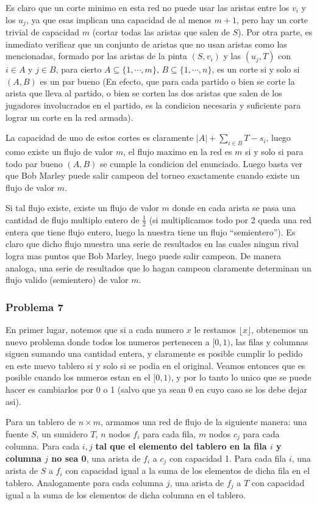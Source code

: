\documentclass{article}
\begin{document}
Es claro que un corte minimo en esta red no puede usar las aristas entre los $v_i$ y los $u_j$, ya que esas implican una capacidad de al menos
$m+1$, pero hay un corte trivial de capacidad $m$ (cortar todas las aristas que salen de $S$). Por otra parte, es inmediato verificar que
un conjunto de aristas que no usan aristas como las mencionadas, formado por las aristas de la pinta $(S,v_i)$ y las $(u_j,T)$ con
$i \in A$ y $j \in B$, para cierto $A \subseteq \{ 1, \cdots , m \}$, $B \subseteq \{ 1, \cdots, n \}$, es un corte si y solo si $(A,B)$ es
un par bueno (En efecto, que para cada partido o bien se corte la arista que lleva al partido, o bien se corten las dos aristas que salen
de los jugadores involucrados en el partido, es la condicion necesaria y suficiente para lograr un corte en la red armada).

La capacidad de uno de estos cortes es claramente $|A| + \sum_{i \in B}{T - s_i}$, luego como existe un flujo de valor $m$, el flujo
maximo en la red es $m$ si y solo si para todo par bueno $(A,B)$ se cumple la condicion del enunciado. Luego basta ver que Bob Marley
puede salir campeon del torneo exactamente cuando existe un flujo de valor $m$.

Si tal flujo existe, existe un flujo de valor $m$ donde en cada arista se pasa una cantidad de flujo multiplo entero de $\frac{1}{2}$ (si multiplicamos
todo por 2 queda una red entera que tiene flujo entero, luego la nuestra tiene un flujo ``semientero''). Es claro que dicho flujo muestra
una serie de resultados en las cuales ningun rival logra mas puntos que Bob Marley, luego puede salir campeon. De manera analoga, una
serie de resultados que lo hagan campeon claramente determinan un flujo valido (semientero) de valor $m$.

\subsubsection{Problema 7}

En primer lugar, notemos que si a cada numero $x$ le restamos $\lfloor x \rfloor$, obtenemos un nuevo problema donde todos los numeros
pertenecen a $[0,1)$, las filas y columnas siguen sumando una cantidad entera, y claramente es posible cumplir lo pedido en este nuevo
tablero si y solo si se podia en el original. Veamos entonces que es posible cuando los numeros estan en el $[0,1)$, y por lo tanto
lo unico que se puede hacer es cambiarlos por 0 o 1 (salvo que ya sean 0 en cuyo caso se los debe dejar asi).

Para un tablero de $n \times m$, armamos una red de flujo de la siguiente manera: una fuente $S$, un sumidero $T$, $n$ nodos $f_i$ para cada
fila, $m$ nodos $c_j$ para cada columna. Para cada $i,j$ \textbf{ tal que el elemento del tablero en la fila $i$ y columna $j$ no sea 0}, 
una arista de $f_i$ a $c_j$ con capacidad 1. Para cada fila $i$, una arista de
$S$ a $f_i$ con capacidad igual a la suma de los elementos de dicha fila en el tablero. Analogamente para cada columna $j$, 
una arista de $f_j$ a $T$ con capacidad igual a la suma de los elementos de dicha columna en el tablero.
\end{document}
